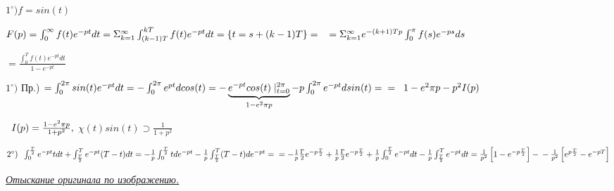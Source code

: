 \documentclass{article}
\begin{document}
\begin{large}
\vspace{0.5cm}
$1^{\circ}) f = sin(t) $ 

\vspace{0.5cm}
{\Large $F(p) = \int_0^\infty f(t)e^{-pt}dt = \Sigma_{k=1}^\infty \int_{(k-1)T}^{kT} f(t)e^{-pt} dt = \lbrace t = s + (k-1)T\rbrace = \\ \text{\hspace{0.2cm}} = \Sigma_{k=1}^\infty e^{-(k+1)Tp} \int_0^\pi f(s) e^{-ps} ds$}
\begin{LARGE}
$ = \frac{\int_0^T f(t)e^{-pt}dt}{1 - e^{-pt}}$
\end{LARGE}

\vspace{0.5cm}
\begin{large}
$1^{\circ})$ Пр.) $ = \int_0^{2\pi} sin(t) e^{-pt} dt = - \int_0^{2\pi} e^{pt} d cos(t) = -\underbrace{e^{-pt}cos(t)\mid_{t=0}^{2\pi} }_{1-e^2\pi p} - p\int_0^{2\pi}e^{-pt} d sin(t)  
=\\ =\text{\hspace{0.2cm}} 1-e^2\pi p - p^2 I(p)$
\end{large}

\vspace{0.5cm}
\begin{Large}
$
\text{\hspace{0.2cm}} I(p) = \frac{1-e^2\pi p}{1+p^2},
$
\hspace{0.8cm}
$
\chi(t)sin(t)\supset \frac{1}{1+p^2}
$

\end{Large}

\vspace{0.5cm}
\begin{Large}
$2^{\circ}) \text{\hspace{0.2cm}} \int_0^{\frac{T}{2}}e^{-pt}tdt + \int_{\frac{T}{2}}^T e^{-pt}(T -t)dt = 
-\frac{1}{p}\int_0^{\frac{T}{2}} t de^{-pt} -\frac{1}{p} \int_{\frac{T}{2}}^T (T - t) de^{-pt} = \\ =
-\frac{1}{p}\frac{\Gamma}{2}e^{-p\frac{T}{2}} + \frac{1}{p}\frac{\Gamma}{2}e^{-p\frac{T}{2}} + \frac{1}{p}\int_0^{\frac{T}{2}} e^{-pt} dt - \frac{1}{p}\int_{\frac{T}{2}}^T e^{-pt}dt =
\frac{1}{p^2}\left[1-e^{-p\frac{T}{2}}\right] - \\ - \frac{1}{p^2}\left[e^{p\frac{T}{2}} - e^{-pT}\right]
$
\end{Large}

\newpage
\begin{LARGE}
\textit{\underline{Отыскание оригинала по изображению.}}
\end{LARGE}


\end{large}
\end{document}
